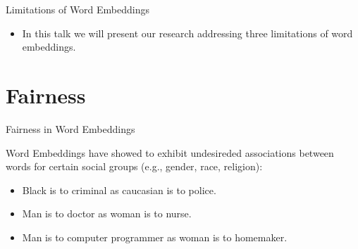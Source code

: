 \documentclass[handout]{beamer}
\begin{document}
\begin{frame}{Limitations of Word Embeddings}
\begin{scriptsize}
\begin{itemize}


\item In this talk we will present our research addressing three limitations of word embeddings.





\end{itemize}
\end{scriptsize}
\end{frame}

\section{Fairness}


\begin{frame}{Fairness in Word Embeddings}
\begin{scriptsize}
 Word Embeddings have showed to exhibit undesireded associations between words for certain social groups (e.g., gender, race, religion):
\begin{itemize}
\item Black is to criminal as caucasian is to police.
\item Man is to doctor as woman is to nurse.
\item Man is to computer programmer as woman is to homemaker.
\end{itemize}


\end{scriptsize}
\end{frame}
\end{document}
